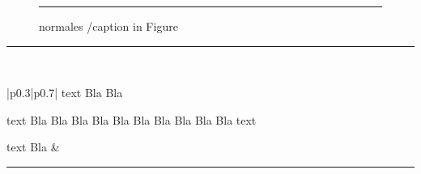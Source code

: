 \documentclass[12pt]{scrartcl}
\begin{document}
\begin{figure}\rule{2cm}{1cm}\caption{normales /caption in Figure}\end{figure}

\begingroup\rule{3cm}{2cm}\\ \endgroup

\begin{longtable}{|p{0.3\textwidth}|p{0.7\textwidth}|}\hline
text Bla Bla \par text Bla Bla Bla Bla Bla Bla Bla Bla Bla Bla text  \par text Bla 
&
\begin{minipage}[t]{\linewidth}%
  \vspace{0.1mm}\centering\rule{3cm}{3cm}%
  \let\caption\OrigCaption
  \vspace{0.1mm}%
  \end{minipage}\\
\hline
\end{longtable}

\listoffigures
\end{document}
